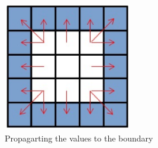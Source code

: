 \begin{figure}[h!]
	\centering
	\includegraphics[width=0.5\textwidth]{imm/tep/tep2.png}  
	\caption{Propagarting the values to the boundary} 
	\label{tep2}
\end{figure}

